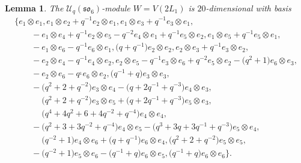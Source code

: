 \documentclass[pdftex]{sigma}
\numberwithin{equation}{section}
\newtheorem{Lemma}[Theorem]{Lemma}
\theoremstyle{definition}
\begin{document}
\begin{Lemma}\label{lemma--Wis20dimensional} The $\mathcal{U}_q(\mathfrak{so}_6)$-module $W=V(2L_1)$ is $20$-dimensional with basis
\begin{gather}
 \{ e_1 \otimes e_1, e_1 \otimes e_2 + q^{-1}e_2 \otimes e_1, e_1\otimes e_3 + q^{-1}e_3 \otimes e_1,\nonumber \\
 \qquad-e_1 \otimes e_4 +q^{-1}e_2 \otimes e_5 - q^{-2}e_4 \otimes e_1+q^{-1}e_5 \otimes e_2, e_1\otimes e_5 +q^{-1}e_5 \otimes e_1, \nonumber\\
 \qquad- e_1 \otimes e_6-q^{-1}e_6 \otimes e_1, \bigl(q+q^{-1}\bigr)e_2 \otimes e_2,e_2 \otimes e_3 + q^{-1} e_3 \otimes e_2, \nonumber\\
 \qquad-e_2 \otimes e_4 -q^{-1}e_4 \otimes e_2, e_2 \otimes e_5 - q^{-1}e_3 \otimes e_6+q^{-2}e_5 \otimes e_2 -\bigl(q^2+1\bigr)e_6 \otimes e_3,\nonumber\\
 \qquad-e_2 \otimes e_6 -q^{_1}e_6\otimes e_2,\bigl(q^{-1}+q\bigr)e_3 \otimes e_3, \nonumber\\
 \qquad-\bigl(q^2 +2 +q^{-2}\bigr)e_3 \otimes e_4 - \bigl(q+2q^{-1}+q^{-3}\bigr)e_4 \otimes e_3, \nonumber\\
 \qquad\phantom{-}{}\bigl(q^2 + 2+q^{-2}\bigr)e_3 \otimes e_5 + \bigl(q+2q^{-1}+q^{-3}\bigr)e_5 \otimes e_3, \nonumber \\
 \qquad\phantom{-}{}
 \bigl(q^4 + 4q^2 + 6 + 4q^{-2} + q^{-4}\bigr)e_4 \otimes e_4,\nonumber \\
 \qquad-\bigl(q^2+3+3q^{-2}+q^{-4}\bigr)e_4 \otimes e_5 - \bigl(q^3 +3q+3q^{-1}+q^{-3}\bigr)e_5 \otimes e_4, \nonumber \\
 \qquad\phantom{-}{}\bigl(q^{-2}+1\bigr)e_4 \otimes e_6 +\bigl(q+q^{-1}\bigr)e_6 \otimes e_4,\bigl(q^2+2+q^{-2}\bigr)e_5 \otimes e_5,\nonumber \\
 \qquad-\bigl(q^{-2}+1\bigr)e_5 \otimes e_6 - \bigl(q^{-1}+q\bigr)e_6 \otimes e_5, \bigl(q^{-1}+q\bigr)e_6 \otimes e_6\}. \label{Wbasis}
\end{gather}
\end{Lemma}
\end{document}
